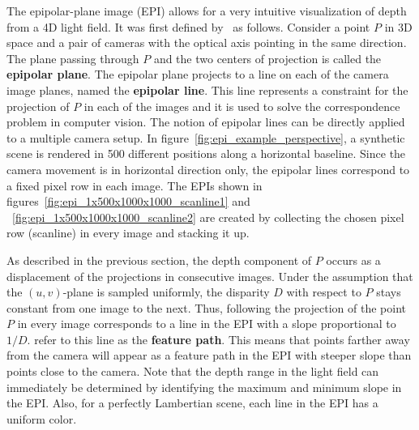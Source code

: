 The epipolar-plane image (EPI) allows for a very intuitive visualization of depth from a 4D light field.
It was first defined by~\cite{EPI} as follows.
Consider a point $P$ in 3D space and a pair of cameras with the optical axis pointing in the same direction.
The plane passing through $P$ and the two centers of projection is called the \textbf{epipolar plane}.
The epipolar plane projects to a line on each of the camera image planes, named the \textbf{epipolar line}.
This line represents a constraint for the projection of $P$ in each of the images and it is used to solve the correspondence problem in computer vision.
The notion of epipolar lines can be directly applied to a multiple camera setup.
In figure~\ref{fig:epi_example_perspective}, a synthetic scene is rendered in 500 different positions along a horizontal baseline.
Since the camera movement is in horizontal direction only, the epipolar lines correspond to a fixed pixel row in each image.
The EPIs shown in figures~\ref{fig:epi_1x500x1000x1000_scanline1} and ~\ref{fig:epi_1x500x1000x1000_scanline2} are created by collecting the chosen pixel row (scanline) in every image and stacking it up.

As described in the previous section, the depth component of $P$ occurs as a displacement of the projections in consecutive images.
Under the assumption that the $(u, v)$-plane is sampled uniformly, the disparity $D$ with respect to $P$ stays constant from one image to the next.
Thus, following the projection of the point $P$ in every image corresponds to a line in the EPI with a slope proportional to $1 / D$.
\cite{EPI} refer to this line as the \textbf{feature path}.
This means that points farther away from the camera will appear as a feature path in the EPI with steeper slope than points close to the camera.
Note that the depth range in the light field can immediately be determined by identifying the maximum and minimum slope in the EPI.
Also, for a perfectly Lambertian scene, each line in the EPI has a uniform color.

